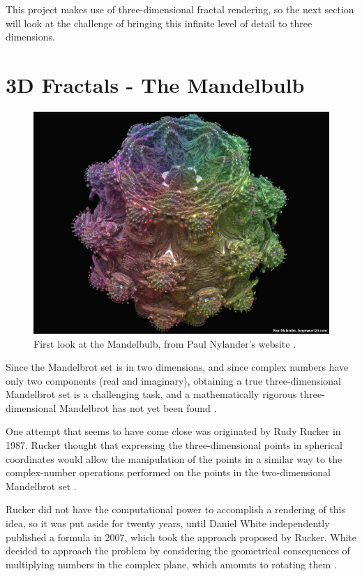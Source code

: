This project makes use of three-dimensional fractal rendering, so the next section will look at the challenge of bringing this infinite level of detail to three dimensions.

\newpage

\section{3D Fractals - The Mandelbulb}

\begin{figure} [ht]
	\centering
	\includegraphics[width=0.5\linewidth, frame]{Images/Mandelbulb-First-Look.jpg}
	\caption{First look at the Mandelbulb, from Paul Nylander's website \cite{nylander-mandelbulb-image}.}
	\label{figure:mandelbulb-first-look}
\end{figure}

Since the Mandelbrot set is in two dimensions, and since complex numbers have only two components (real and imaginary), obtaining a true three-dimensional Mandelbrot set is a challenging task, and a mathematically rigorous three-dimensional Mandelbrot has not yet been found \cite{aron2009mandelbulb}.\newline

One attempt that seems to have come close was originated by Rudy Rucker in 1987. Rucker thought that expressing the three-dimensional points in spherical coordinates would allow the manipulation of the points in a similar way to the complex-number operations performed on the points in the two-dimensional Mandelbrot set \cite{rucker2009search}.\newline

Rucker did not have the computational power to accomplish a rendering of this idea, so it was put aside for twenty years, until Daniel White independently published a formula in 2007, which took the approach proposed by Rucker. White decided to approach the problem by considering the geometrical consequences of multiplying numbers in the complex plane, which amounts to rotating them \cite{aron2009mandelbulb}.\newline

